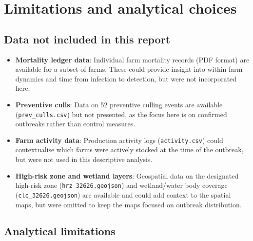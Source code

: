 \documentclass[
]{article}
\begin{document}
\section{Limitations and analytical
choices}\label{limitations-and-analytical-choices}

\subsection{Data not included in this
report}\label{data-not-included-in-this-report}

\begin{itemize}
\item
  \textbf{Mortality ledger data}: Individual farm mortality records (PDF
  format) are available for a subset of farms. These could provide
  insight into within-farm dynamics and time from infection to
  detection, but were not incorporated here.
\item
  \textbf{Preventive culls}: Data on 52 preventive culling events are
  available (\texttt{prev\_culls.csv}) but not presented, as the focus
  here is on confirmed outbreaks rather than control measures.
\item
  \textbf{Farm activity data}: Production activity logs
  (\texttt{activity.csv}) could contextualise which farms were actively
  stocked at the time of the outbreak, but were not used in this
  descriptive analysis.
\item
  \textbf{High-risk zone and wetland layers}: Geospatial data on the
  designated high-risk zone (\texttt{hrz\_32626.geojson}) and
  wetland/water body coverage (\texttt{clc\_32626.geojson}) are
  available and could add context to the spatial maps, but were omitted
  to keep the maps focused on outbreak distribution.
\end{itemize}

\subsection{Analytical limitations}\label{analytical-limitations}
\end{document}
